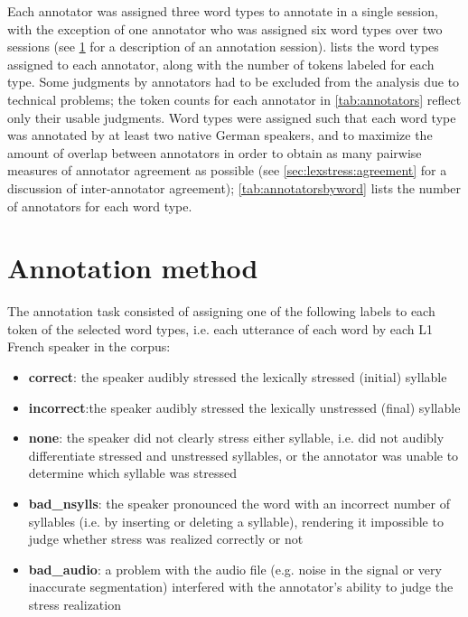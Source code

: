 	
	Each annotator was assigned three word types to annotate in a single session, with the exception of one annotator who was assigned six word types over two sessions (see \cref{sec:lexstress:method} for a description of an annotation session).  lists the word types assigned to each annotator, along with the number of tokens labeled for each type. Some judgments by annotators  had to be excluded from the analysis due to technical problems; the token counts for each annotator in \cref{tab:annotators} reflect only their usable judgments.  Word types were assigned such that each word type was annotated by at least two native German speakers, and to maximize the amount of overlap between annotators in order to obtain as many pairwise measures of annotator agreement as possible (see \cref{sec:lexstress:agreement} for a discussion of inter-annotator agreement); \cref{tab:annotatorsbyword} lists the number of annotators for each word type.
	
	
	
	
	\section{Annotation method}
	\label{sec:lexstress:method}

	The annotation task consisted of assigning one of the following labels to 
	each token of the selected word types, i.e. each utterance of each word by each L1 French speaker in the corpus:
	
	\begin{itemize}
	\item{\textbf{correct}: the speaker audibly stressed the lexically stressed (initial) syllable}
	\item{\textbf{incorrect}:the speaker audibly stressed the lexically unstressed (final) syllable}
	\item{\textbf{none}: the speaker did not clearly stress either syllable, i.e. did not audibly differentiate stressed and unstressed syllables, or the annotator was unable to determine which syllable was stressed}
	\item{\textbf{bad\_nsylls}: the speaker pronounced the word with an incorrect number of syllables (i.e. by inserting or deleting a syllable), rendering it impossible to judge whether stress was realized correctly or not}
	\item{\textbf{bad\_audio}: a problem with the audio file (e.g. noise in the signal or very inaccurate segmentation) interfered with the annotator's ability to judge the stress realization}
	 \end{itemize}
	
